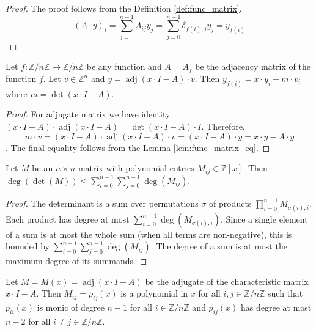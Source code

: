 \begin{proof}
The proof follows from the Definition \ref{def:func_matrix}.
$$(A\cdot y)_i = \sum_{j=0}^{n-1} A_{ij} y_j = \sum_{j=0}^{n-1} \delta_{f(i),j} y_j = y_{f(i)}$$
\end{proof}

\begin{lemma}
\label{lem:adj_eq}
\leanok
Let $f: \mathbb{Z}/n\mathbb{Z} \to \mathbb{Z}/n\mathbb{Z}$ be any function and $A=A_f$ be the adjacency matrix of the function $f$. 
Let $v\in \mathbb{Z}^n$ and $y = \operatorname{adj}(x\cdot I - A)\cdot v$. 
Then $y_{f(i)} = x\cdot y_i - m\cdot v_i$ where $m = \det(x\cdot I - A)$.
\end{lemma}

\begin{proof}
For adjugate matrix we have identity 
$(x\cdot I - A)\cdot \operatorname{adj} (x\cdot I - A) = \det(x\cdot I - A)\cdot I$.
Therefore,
$$m\cdot v = (x\cdot I - A)\cdot \operatorname{adj} (x\cdot I - A)\cdot v 
= (x\cdot I - A)\cdot y = x\cdot y - A\cdot y$$.
The final equality follows from the Lemma \ref{lem:func_matrix_eq}.
\end{proof}

\begin{lemma}
\label{lem:det_degree_le_sum_degrees}
\leanok
Let $M$ be an $n \times n$ matrix with polynomial entries $M_{ij} \in \mathbb{Z}[x]$.
Then $\deg(\det(M)) \leq \sum_{i=0}^{n-1} \sum_{j=0}^{n-1} \deg(M_{ij})$.
\end{lemma}

\begin{proof}
The determinant is a sum over permutations $\sigma$ of products $\prod_{i=0}^{n-1} M_{\sigma(i),i}$.
Each product has degree at most $\sum_{i=0}^{n-1} \deg(M_{\sigma(i),i})$.
Since a single element of a sum is at most the whole sum (when all terms are non-negative), 
this is bounded by $\sum_{i=0}^{n-1} \sum_{j=0}^{n-1} \deg(M_{ij})$.
The degree of a sum is at most the maximum degree of its summands.
\end{proof}

\begin{lemma}
\label{lem:adj_poly}
Let $M = M(x) = \operatorname{adj}(x\cdot I - A)$ be the adjugate of the characteristic matrix $x\cdot I - A$.
Then $M_{ij} = p_{ij}(x)$ is a polynomial in $x$ for all $i,j\in \mathbb{Z}/n\mathbb{Z}$ such that
$p_{ii}(x)$ is monic of degree $n-1$ for all $i\in \mathbb{Z}/n\mathbb{Z}$ and
$p_{ij}(x)$ has degree at most $n-2$ for all $i\neq j\in \mathbb{Z}/n\mathbb{Z}$.
\end{lemma}

